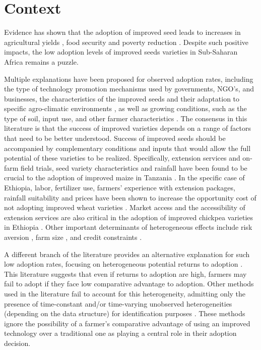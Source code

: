 \documentclass{article}
\begin{document}
\section{Context}

Evidence has shown that the adoption of improved seed leads to increases in agricultural yields \citep{Carter2014-fm}, food security \citep{Shiferaw2014-op} and poverty reduction \citep{Minten2008-tj}. Despite such positive impacts, the low adoption levels of improved seeds varieties in Sub-Saharan Africa remains a puzzle. 


Multiple explanations have been proposed for observed adoption rates, including the type of technology promotion mechanisms used by governments, NGO’s, and businesses, the characteristics of the improved seeds and their adaptation to specific agro-climatic environments \citep{Bird2020-nt}, as well as growing conditions, such as the type of soil, input use, and other farmer characteristics \citep{Munshi2004-og}. The consensus in this literature is that the success of improved varieties depends on a range of factors that need to be better understood. Success of improved seeds should be accompanied by complementary conditions and inputs that would allow the full potential of these varieties to be realized. Specifically, extension services and on-farm field trials, seed variety characteristics and rainfall have been found to be crucial to the adoption of improved maize in Tanzania \citep{Kaliba2000-jh}. In the specific case of Ethiopia, labor, fertilizer use, farmers’ experience with extension packages, rainfall suitability and prices have been shown to increase the opportunity cost of not adopting improved wheat varieties \citep{Wale2006-bv}. Market access and the accessibility of extension services are also critical in the adoption of improved chickpea varieties in Ethiopia \citep{Verkaart2019-ol}. Other important determinants of heterogeneous effects include risk aversion \citep{Holden2016-vy}, farm size \citep{Ghimire2015-bd}, and credit constraints \citep{Simtowe2008-jn,Balana2020-hx}.



A different branch of the literature provides an alternative explanation for such low adoption rates, focusing on heterogeneous potential returns to adoption \citep{Suri2011-oi}. This literature suggests that even if returns to adoption are high, farmers may fail to adopt if they face low comparative advantage to adoption. Other methods used in the literature fail to account for this heterogeneity, admitting only the presence of time-constant and/or time-varying unobserved heterogeneities (depending on the data structure) for identification purposes \citep{Kassie2018-xn,Falco2011-rt}. These methods ignore the possibility of a farmer’s comparative advantage of using an improved technology over a traditional one as playing a central role in their adoption decision. 
\end{document}
